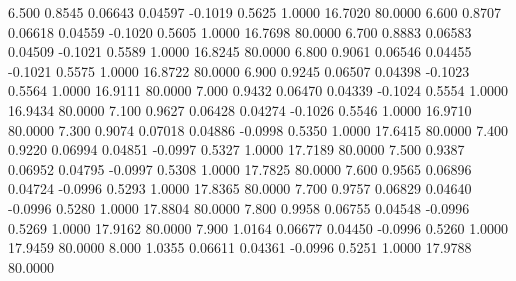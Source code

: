    6.500   0.8545   0.06643   0.04597  -0.1019   0.5625   1.0000  16.7020  80.0000
   6.600   0.8707   0.06618   0.04559  -0.1020   0.5605   1.0000  16.7698  80.0000
   6.700   0.8883   0.06583   0.04509  -0.1021   0.5589   1.0000  16.8245  80.0000
   6.800   0.9061   0.06546   0.04455  -0.1021   0.5575   1.0000  16.8722  80.0000
   6.900   0.9245   0.06507   0.04398  -0.1023   0.5564   1.0000  16.9111  80.0000
   7.000   0.9432   0.06470   0.04339  -0.1024   0.5554   1.0000  16.9434  80.0000
   7.100   0.9627   0.06428   0.04274  -0.1026   0.5546   1.0000  16.9710  80.0000
   7.300   0.9074   0.07018   0.04886  -0.0998   0.5350   1.0000  17.6415  80.0000
   7.400   0.9220   0.06994   0.04851  -0.0997   0.5327   1.0000  17.7189  80.0000
   7.500   0.9387   0.06952   0.04795  -0.0997   0.5308   1.0000  17.7825  80.0000
   7.600   0.9565   0.06896   0.04724  -0.0996   0.5293   1.0000  17.8365  80.0000
   7.700   0.9757   0.06829   0.04640  -0.0996   0.5280   1.0000  17.8804  80.0000
   7.800   0.9958   0.06755   0.04548  -0.0996   0.5269   1.0000  17.9162  80.0000
   7.900   1.0164   0.06677   0.04450  -0.0996   0.5260   1.0000  17.9459  80.0000
   8.000   1.0355   0.06611   0.04361  -0.0996   0.5251   1.0000  17.9788  80.0000
